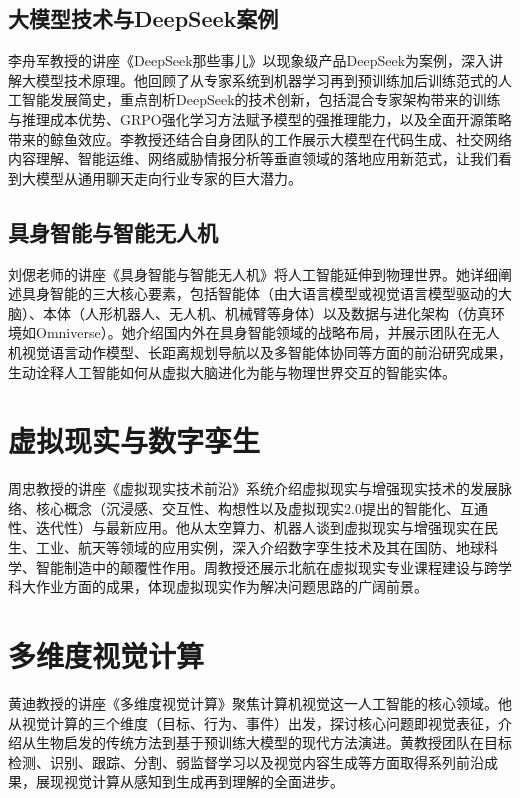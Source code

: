 \subsection{大模型技术与DeepSeek案例}

李舟军教授的讲座《DeepSeek那些事儿》以现象级产品DeepSeek为案例，深入讲解大模型技术原理。他回顾了从专家系统到机器学习再到预训练加后训练范式的人工智能发展简史，重点剖析DeepSeek的技术创新，包括混合专家架构带来的训练与推理成本优势、GRPO强化学习方法赋予模型的强推理能力，以及全面开源策略带来的鲸鱼效应。李教授还结合自身团队的工作展示大模型在代码生成、社交网络内容理解、智能运维、网络威胁情报分析等垂直领域的落地应用新范式，让我们看到大模型从通用聊天走向行业专家的巨大潜力。

\subsection{具身智能与智能无人机}

刘偲老师的讲座《具身智能与智能无人机》将人工智能延伸到物理世界。她详细阐述具身智能的三大核心要素，包括智能体（由大语言模型或视觉语言模型驱动的大脑）、本体（人形机器人、无人机、机械臂等身体）以及数据与进化架构（仿真环境如Omniverse）。她介绍国内外在具身智能领域的战略布局，并展示团队在无人机视觉语言动作模型、长距离规划导航以及多智能体协同等方面的前沿研究成果，生动诠释人工智能如何从虚拟大脑进化为能与物理世界交互的智能实体。

\section{虚拟现实与数字孪生}

周忠教授的讲座《虚拟现实技术前沿》系统介绍虚拟现实与增强现实技术的发展脉络、核心概念（沉浸感、交互性、构想性以及虚拟现实2.0提出的智能化、互通性、迭代性）与最新应用。他从太空算力、机器人谈到虚拟现实与增强现实在民生、工业、航天等领域的应用实例，深入介绍数字孪生技术及其在国防、地球科学、智能制造中的颠覆性作用。周教授还展示北航在虚拟现实专业课程建设与跨学科大作业方面的成果，体现虚拟现实作为解决问题思路的广阔前景。

\section{多维度视觉计算}

黄迪教授的讲座《多维度视觉计算》聚焦计算机视觉这一人工智能的核心领域。他从视觉计算的三个维度（目标、行为、事件）出发，探讨核心问题即视觉表征，介绍从生物启发的传统方法到基于预训练大模型的现代方法演进。黄教授团队在目标检测、识别、跟踪、分割、弱监督学习以及视觉内容生成等方面取得系列前沿成果，展现视觉计算从感知到生成再到理解的全面进步。

